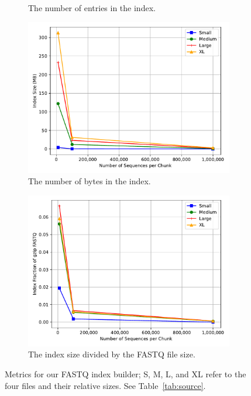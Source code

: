 \begin{figure}
\begin{subfigure}[c]{.48\textwidth}
        \caption{The number of entries in the index.}
        \label{fig:entries}
    \end{subfigure}%
    \hfill
    \begin{subfigure}[c]{.48\textwidth}
        \includegraphics[width=\linewidth]{figs/index-bytes.pdf}
        \caption{The number of bytes in the index.}
        \label{fig:bytes}
    \end{subfigure}%
    \begin{subfigure}[c]{.48\textwidth}
        \includegraphics[width=\linewidth]{figs/index-frac.pdf}
        \caption{The index size divided by the \gzip FASTQ file size.}
        \label{fig:frac}
    \end{subfigure}%
    \caption{Metrics for our \gzip FASTQ index builder; S, M, L, and XL refer to
    the four \gzip files and their relative sizes. See Table~\ref{tab:source}.}
    \label{fig:builder}
\end{figure}

